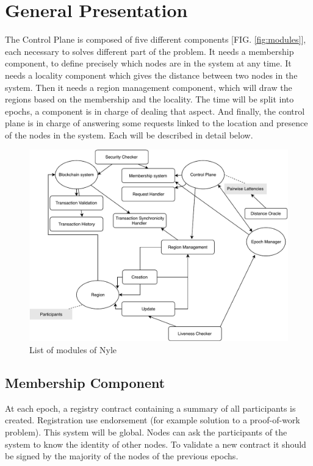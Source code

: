 \documentclass[a4paper,11pt,oneside]{report}
\begin{document}
\section{General Presentation}

The Control Plane is composed of five different components [FIG.
\autoref{fig:modules}], each necessary to solves different part of the problem. It
needs a membership component, to define precisely which nodes are in the system
at any time. It needs a locality component which gives the distance between two
nodes in the system. Then it needs a region management component, which will
draw the regions based on the membership and the locality. The time will be
split into epochs, a component is in charge of dealing that aspect. And
finally, the control plane is in charge of answering some requests linked to
the location and presence of the nodes in the system. Each will be described in
detail below. 

\begin{figure}[!h]
\centering
\includegraphics[width=400pt]{figures/Nyle_components}
\caption{List of modules of Nyle}
\label{fig:modules}
\end{figure}

\subsection{Membership Component}

At each epoch, a registry contract containing a summary of all participants is
created. Registration use endorsement (for example solution to a proof-of-work
problem).  This system will be global. Nodes can ask the participants of the
system to know the identity of other nodes. To validate a new contract  it
should be signed by the majority of the nodes of the previous epochs.
\end{document}
